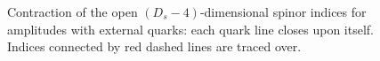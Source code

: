 \begin{figure}[]
  \begin{center}
\end{center} 
\caption{Contraction of the open $(D_s-4)$-dimensional spinor indices for amplitudes
with external quarks: each quark line closes upon itself.
Indices connected by red dashed lines are traced over.}
\label{fig_traces}
\end{figure}
